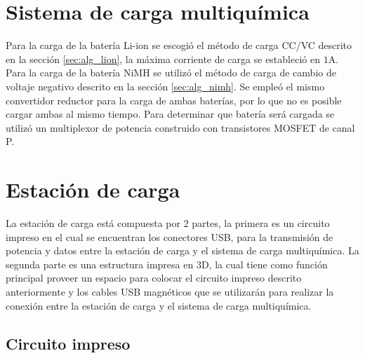 \chapter{Sistema de carga multiquímica}

Para la carga de la batería Li-ion se escogió el método de carga CC/VC
descrito en la sección \ref{sec:alg_lion}, la máxima corriente de carga
se estableció en $1\text{A}$. Para la carga de la batería NiMH se utilizó
el método de carga de cambio de voltaje negativo descrito en la sección 
\ref{sec:alg_nimh}. Se empleó el mismo convertidor reductor para la carga
de ambas baterías, por lo que no es posible cargar ambas al mismo tiempo.
Para determinar que batería será cargada se utilizó un multiplexor de potencia
construido con transistores MOSFET de canal P.
    

    
    
    

    

    

    

    
    
    



    
        


\chapter{Estación de carga}

La estación de carga está compuesta por 2 partes, la primera es un circuito impreso
en el cual se encuentran los conectores USB, para la transmisión de potencia y 
datos entre la estación de carga y el sistema de carga multiquímica. La segunda
parte es una estructura impresa en 3D, la cual tiene como función principal
proveer un espacio para colocar el circuito impreso descrito anteriormente y 
los cables USB magnéticos que se utilizarán para realizar la conexión entre
la estación de carga y el sistema de carga multiquímica.


\section{Circuito impreso}

